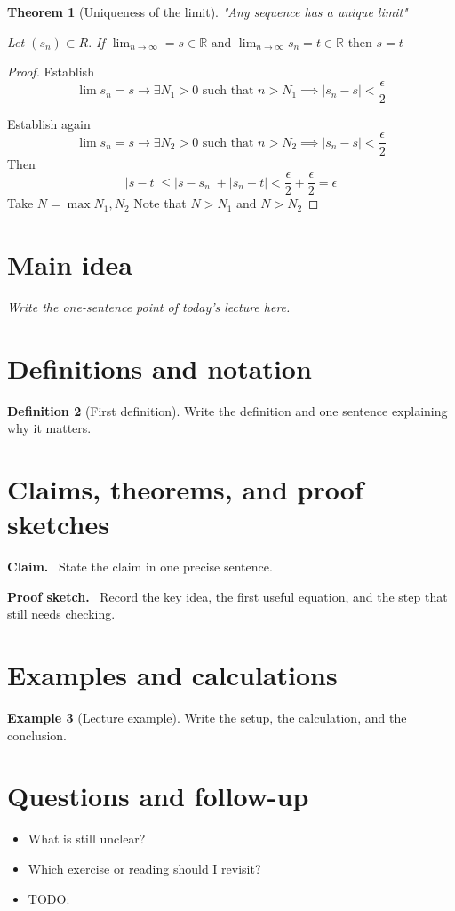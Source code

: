 \documentclass[11pt]{article}
\newcommand{\1}{\mathbf{1}}
\theoremstyle{notestyle}
\newtheorem{theorem}{Theorem}[section]
\theoremstyle{definition}
\newtheorem{definition}[theorem]{Definition}
\newtheorem{example}[theorem]{Example}
\newenvironment{claim}{\par\noindent\textbf{Claim.}\ }{\par}
\newenvironment{proofsketch}{\par\noindent\textbf{Proof sketch.}\ }{\par}
\begin{document}
\begin{theorem}[Uniqueness of the limit]
\label{thm:label}
"Any sequence has a unique limit"
\par Let $(s_n)\subset R.$ If $\lim_{n\rightarrow\infty}=s\in\mathbb{R}\text{ and }
\lim_{n\rightarrow \infty}{s_n}=t\in \mathbb{R} \text{ then } s = t$
\end{theorem}
\begin{proof}
    Establish
    $$\lim s_n = s\rightarrow \exists N_1 > 0 \text{ such that } n > N_1 \implies |s_n -
    s| < \frac{\epsilon}{2}$$
    \par Establish again $$\lim s_n = s\rightarrow \exists N_2 > 0 \text{ such that } n
    > N_2 \implies |s_n - s| < \frac{\epsilon}{2}$$ 
    Then $$\left|s-t\right| \le |s - s_n| + |s_n - t| <
    \frac{\epsilon}{2}+\frac{\epsilon}{2}  =\epsilon$$
    Take $N = \max {N_1, N_2}$ Note that $N > N_1$ and $N > N_2$
\end{proof}
\section{Main idea}
\textit{Write the one-sentence point of today's lecture here.}

\section{Definitions and notation}
\begin{definition}[First definition]
Write the definition and one sentence explaining why it matters.
\end{definition}

\section{Claims, theorems, and proof sketches}
\begin{claim}
State the claim in one precise sentence.
\end{claim}

\begin{proofsketch}
Record the key idea, the first useful equation, and the step that still needs checking.
\end{proofsketch}

\section{Examples and calculations}
\begin{example}[Lecture example]
Write the setup, the calculation, and the conclusion.
\end{example}

\section{Questions and follow-up}
\begin{itemize}
  \item What is still unclear?
  \item Which exercise or reading should I revisit?
  \item TODO: 
\end{itemize}
\end{document}

